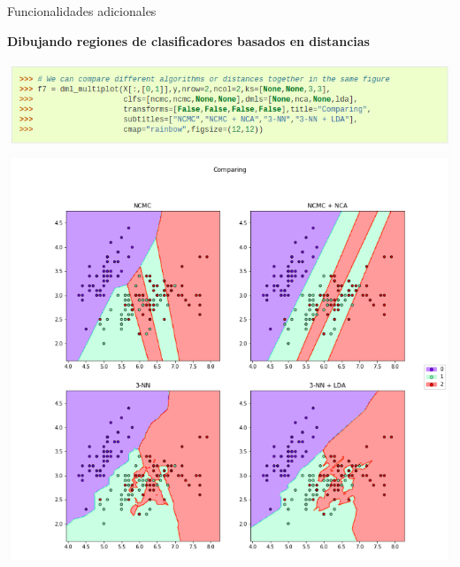 \documentclass[10pt, compress]{beamer}
\begin{document}
\begin{frame}{Funcionalidades adicionales}
  \begin{center}\textbf{Dibujando regiones de clasificadores basados en distancias} \end{center}
  \centering\includegraphics[height=0.8\textheight]{images/ex_plot.png}
\end{frame}
\end{document}
